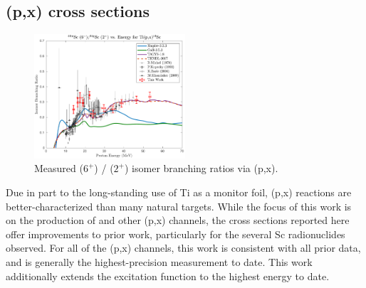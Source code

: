 


\subsection{(p,x) cross sections} 


\begin{figure}[h]
 \centering
 \includegraphics[width=0.5\textwidth]{./figures/44Sc_IBR.pdf}
 \caption{Measured  ($6^+$) /   ($2^+$)  isomer branching ratios via (p,x).}
 \label{fig:44Sc_IBR}
\end{figure}



Due in part to the long-standing use of Ti as a monitor foil,  (p,x) reactions are better-characterized than many  natural targets.
While the focus of this work is on the production of   and other (p,x) channels, the cross sections reported here offer improvements to prior work, particularly for the several Sc radionuclides observed. 
For all of the (p,x) channels, this work is consistent with all prior data, and is generally the highest-precision measurement to date.
This work additionally  extends the  excitation function to the highest energy to date. 



